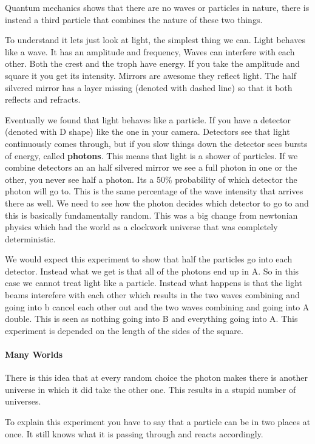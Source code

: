 \documentclass{article}
\begin{document}
Quantum mechanics shows that there are no waves or particles in nature, there is instead a third particle that combines the nature of these two things.

To understand it lets just look at light, the simplest thing we can. Light behaves like a wave. It has an amplitude and frequency, Waves can interfere with each other. Both the crest and the troph have energy. If you take the amplitude and square it you get its intensity. Mirrors are awesome they reflect light. The half silvered mirror has a layer missing (denoted with dashed line) so that it both reflects and refracts.

Eventually we found that light behaves like a particle. If you have a detector (denoted with D shape) like the one in your camera. Detectors see that light continuously comes through, but if you slow things down the detector sees bursts of energy, called \textbf{photons}. This means that light is a shower of particles. If we combine detectors an an half silvered mirror we see a full photon in one or the other, you never see half a photon. Its a 50\% probability of which detector the photon will go to. This is the same percentage of the wave intensity that arrives there as well. We need to see how the photon decides which detector to go to and this is basically fundamentally random. This was a big change from newtonian physics which had the world as a clockwork universe that was completely deterministic.

We would expect this experiment to show that half the particles go into each detector. Instead what we get is that all of the photons end up in A. So in this case we cannot treat light like a particle. Instead what happens is that the light beams interefere with each other which results in the two waves combining and going into b cancel each other out and the two waves combining and going into A double. This is seen as nothing going into B and everything going into A. This experiment is depended on the length of the sides of the square.

\paragraph{Many Worlds}
\label{par:many_worlds}
There is this idea that at every random choice the photon makes there is another universe in which it did take the other one. This results in a stupid number of universes.

To explain this experiment you have to say that a particle can be in two places at once. It still knows what it is passing through and reacts accordingly.
\end{document}
